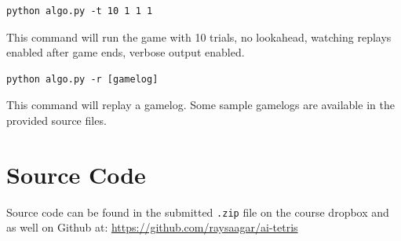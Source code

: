 \documentclass[12pt]{article}
\begin{document}
\begin{verbatim}
python algo.py -t 10 1 1 1
\end{verbatim}
This command will run the game with 10 trials, no lookahead, watching replays enabled after game ends, verbose output enabled.

\begin{verbatim}
python algo.py -r [gamelog]
\end{verbatim}
This command will replay a gamelog. Some sample gamelogs are available in the provided source files.

\section{Source Code}   
Source code can be found in the submitted \verb|.zip| file on the course dropbox and as well on Github at: \url{https://github.com/raysaagar/ai-tetris}
\end{document}
